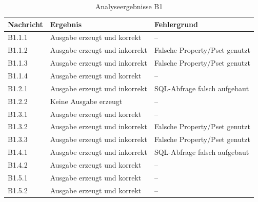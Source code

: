 \begin{table}[h]
    \centering
    \caption{Analyseergebnisse B1}
    \begin{tabular}{C{1.75cm} | C{5cm} | C{5.25cm}}
        \hline
        \textbf{Nachricht} & \textbf{Ergebnis} & \textbf{Fehlergrund} \\
        \hline
        B1.1.1 & Ausgabe erzeugt und korrekt & -- \\
        B1.1.2 & Ausgabe erzeugt und inkorrekt & Falsche Property/Pset genutzt \\
        B1.1.3 & Ausgabe erzeugt und inkorrekt & Falsche Property/Pset genutzt \\
        B1.1.4 & Ausgabe erzeugt und korrekt & -- \\
        B1.2.1 & Ausgabe erzeugt und inkorrekt & SQL-Abfrage falsch aufgebaut \\
        B1.2.2 & Keine Ausgabe erzeugt & -- \\
        B1.3.1 & Ausgabe erzeugt und korrekt & -- \\
        B1.3.2 & Ausgabe erzeugt und inkorrekt & Falsche Property/Pset genutzt \\
        B1.3.3 & Ausgabe erzeugt und inkorrekt & Falsche Property/Pset genutzt \\
        B1.4.1 & Ausgabe erzeugt und inkorrekt & SQL-Abfrage falsch aufgebaut \\
        B1.4.2 & Ausgabe erzeugt und korrekt & -- \\
        B1.5.1 & Ausgabe erzeugt und korrekt & -- \\
        B1.5.2 & Ausgabe erzeugt und korrekt & -- \\
        \hline
    \end{tabular}
\end{table}

